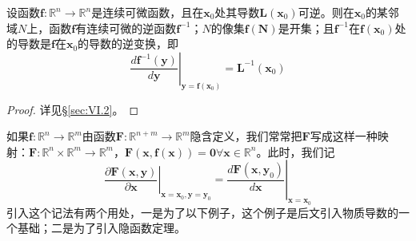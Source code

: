 \documentclass[main.tex]{subfiles}
\begin{document}
\begin{theorem}[反函数定理] 
设函数$\mathbf{f}:\mathbb{R}^n\rightarrow\mathbb{R}^n$是连续可微函数，且在$\mathbf{x}_0$处其导数$\mathbf{L}\left(\mathbf{x}_0\right)$可逆。则在$\mathbf{x}_0$的某邻域$N$上，函数$\mathbf{f}$有连续可微的逆函数$\mathbf{f}^{-1}$；$N$的像集$\mathbf{f}\left(\mathbf{N}\right)$是开集；且$\mathbf{f}^{-1}$在$\mathbf{f}\left(\mathbf{x}_0\right)$处的导数是$\mathbf{f}$在$\mathbf{x}_0$的导数的逆变换，即
\[\left.\frac{d\mathbf{f}^{-1}\left(\mathbf{y}\right)}{d\mathbf{y}}\right|_{\mathbf{y}=\mathbf{f}\left(\mathbf{x}_0\right)}=\mathbf{L}^{-1}\left(\mathbf{x}_0\right)\]
\end{theorem}
\begin{proof}
详见\S\ref{sec:VI.2}。
\end{proof}

如果$\mathbf{f}:\mathbb{R}^n\rightarrow\mathbb{R}^m$由函数$\mathbf{F}:\mathbb{R}^{n+m}\rightarrow\mathbb{R}^m$隐含定义，我们常常把$\mathbf{F}$写成这样一种映射：$\mathbf{F}:\mathbb{R}^n\times\mathbb{R}^m\rightarrow\mathbb{R}^m$，$\mathbf{F}\left(\mathbf{x},\mathbf{f}\left(\mathbf{x}\right)\right)=\mathbf{0}\forall\mathbf{x}\in\mathbb{R}^n$。此时，我们记
\[\left.\frac{\partial \mathbf{F}\left(\mathbf{x},\mathbf{y}\right)}{\partial \mathbf{x}}\right|_{\mathbf{x}=\mathbf{x}_0,\mathbf{y}=\mathbf{y}_0}=\left.\frac{d\mathbf{F}\left(\mathbf{x},\mathbf{y}_0\right)}{d\mathbf{x}}\right|_{\mathbf{x}=\mathbf{x}_0}\]
引入这个记法有两个用处，一是为了以下例子，这个例子是后文引入物质导数的一个基础；二是为了引入隐函数定理。
\end{document}

